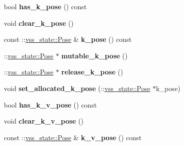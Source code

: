 \begin{DoxyCompactItemize}
\item 
bool {\bfseries has\+\_\+k\+\_\+pose} () const \hypertarget{classvss__state_1_1Ball__State_ad7e1b1d6aa0f6fb49c219a6477c4d415}{}\label{classvss__state_1_1Ball__State_ad7e1b1d6aa0f6fb49c219a6477c4d415}

\item 
void {\bfseries clear\+\_\+k\+\_\+pose} ()\hypertarget{classvss__state_1_1Ball__State_ae093f7fcee14bf36d481defd042531a2}{}\label{classvss__state_1_1Ball__State_ae093f7fcee14bf36d481defd042531a2}

\item 
const \+::\hyperlink{classvss__state_1_1Pose}{vss\+\_\+state\+::\+Pose} \& {\bfseries k\+\_\+pose} () const \hypertarget{classvss__state_1_1Ball__State_ad50969e1c0311df60af86339531e95f4}{}\label{classvss__state_1_1Ball__State_ad50969e1c0311df60af86339531e95f4}

\item 
\+::\hyperlink{classvss__state_1_1Pose}{vss\+\_\+state\+::\+Pose} $\ast$ {\bfseries mutable\+\_\+k\+\_\+pose} ()\hypertarget{classvss__state_1_1Ball__State_a3953797cd45c0dc2ad6bc73c3effce62}{}\label{classvss__state_1_1Ball__State_a3953797cd45c0dc2ad6bc73c3effce62}

\item 
\+::\hyperlink{classvss__state_1_1Pose}{vss\+\_\+state\+::\+Pose} $\ast$ {\bfseries release\+\_\+k\+\_\+pose} ()\hypertarget{classvss__state_1_1Ball__State_a1ee5fc6190261a2b39a059ea215c0393}{}\label{classvss__state_1_1Ball__State_a1ee5fc6190261a2b39a059ea215c0393}

\item 
void {\bfseries set\+\_\+allocated\+\_\+k\+\_\+pose} (\+::\hyperlink{classvss__state_1_1Pose}{vss\+\_\+state\+::\+Pose} $\ast$k\+\_\+pose)\hypertarget{classvss__state_1_1Ball__State_ae45eb76e5900376f40deaeaf0efbac2d}{}\label{classvss__state_1_1Ball__State_ae45eb76e5900376f40deaeaf0efbac2d}

\item 
bool {\bfseries has\+\_\+k\+\_\+v\+\_\+pose} () const \hypertarget{classvss__state_1_1Ball__State_a930e42deca924b95399f2bfd616cfbe5}{}\label{classvss__state_1_1Ball__State_a930e42deca924b95399f2bfd616cfbe5}

\item 
void {\bfseries clear\+\_\+k\+\_\+v\+\_\+pose} ()\hypertarget{classvss__state_1_1Ball__State_a8bb6d21c1aad5ec994362b48b42eb31d}{}\label{classvss__state_1_1Ball__State_a8bb6d21c1aad5ec994362b48b42eb31d}

\item 
const \+::\hyperlink{classvss__state_1_1Pose}{vss\+\_\+state\+::\+Pose} \& {\bfseries k\+\_\+v\+\_\+pose} () const \hypertarget{classvss__state_1_1Ball__State_a145febfeefee751422babd01a98a2c8b}{}\label{classvss__state_1_1Ball__State_a145febfeefee751422babd01a98a2c8b}


\end{DoxyCompactItemize}
